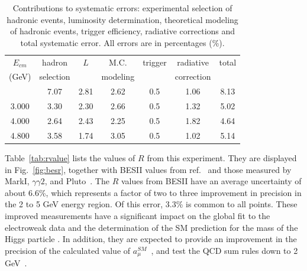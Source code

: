 \begin{table}[htbp]
\caption{Contributions to systematic errors: experimental selection of
hadronic events, luminosity determination, theoretical modeling of 
hadronic events,
trigger efficiency, radiative corrections and total systematic error.
All errors are in percentages (\%).}
\begin{tabular}{ccccccc}
$E_{cm}$ & hadron    & $L$ & M.C.     & trigger & radiative  & total \\
 (GeV)   & selection &     & modeling &         & correction &      \\
\tableline
2.000 & 7.07 & 2.81 & 2.62 & 0.5 & 1.06 & 8.13 \\
3.000 & 3.30 & 2.30 & 2.66 & 0.5 & 1.32 & 5.02 \\
4.000 & 2.64 & 2.43 & 2.25 & 0.5 & 1.82 & 4.64 \\
4.800 & 3.58 & 1.74 & 3.05 & 0.5 & 1.02 & 5.14 \\
\end{tabular}
\label{tab:error}
\end{table}

Table~\ref{tab:rvalue} lists the values of $R$ from this experiment.
They are displayed in 
Fig.~\ref{fig:besr}, together with BESII values from ref.~\cite{besr_1} and 
those measured by MarkI, $\gamma\gamma 2$, and 
Pluto~\cite{mark1,gamma2,pluto}.
The $R$ values from BESII have an average uncertainty of
about 6.6\%, which represents
a factor of two to three improvement in precision 
in the 2 to 5 GeV 
energy region.  Of this error, 3.3\% is common to all points. %
These improved measurements have 
a significant impact on the 
global fit to the electroweak data and
the determination of the SM prediction for the mass
of the Higgs particle \cite{bolekpl}.   In addition, they
are expected to provide an
improvement in the precision of the calculated value of
$a_{\mu}^{SM}$~\cite{ichep2k,martin}, and test the QCD sum rules %
down to 2 GeV~\cite{dave,kuehn}. 

